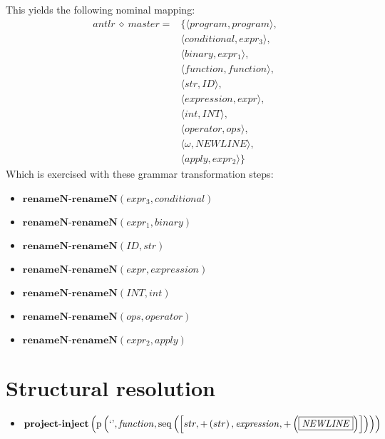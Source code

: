 This yields the following nominal mapping:
\begin{align*}\mathit{antlr} \:\diamond\: \mathit{master} =& \{\langle \mathit{program},\mathit{program}\rangle,\\
 & \langle \mathit{conditional},\mathit{expr_3}\rangle,\\
 & \langle \mathit{binary},\mathit{expr_1}\rangle,\\
 & \langle \mathit{function},\mathit{function}\rangle,\\
 & \langle str,\mathit{ID}\rangle,\\
 & \langle \mathit{expression},\mathit{expr}\rangle,\\
 & \langle int,\mathit{INT}\rangle,\\
 & \langle \mathit{operator},\mathit{ops}\rangle,\\
 & \langle \omega,\mathit{NEWLINE}\rangle,\\
 & \langle \mathit{apply},\mathit{expr_2}\rangle\}\end{align*}
 Which is exercised with these grammar transformation steps:

{\footnotesize\begin{itemize}
\item $\mathbf{renameN\text{-}renameN}\left(\mathit{expr_3},\mathit{conditional}\right)$
\item $\mathbf{renameN\text{-}renameN}\left(\mathit{expr_1},\mathit{binary}\right)$
\item $\mathbf{renameN\text{-}renameN}\left(\mathit{ID},str\right)$
\item $\mathbf{renameN\text{-}renameN}\left(\mathit{expr},\mathit{expression}\right)$
\item $\mathbf{renameN\text{-}renameN}\left(\mathit{INT},int\right)$
\item $\mathbf{renameN\text{-}renameN}\left(\mathit{ops},\mathit{operator}\right)$
\item $\mathbf{renameN\text{-}renameN}\left(\mathit{expr_2},\mathit{apply}\right)$
\end{itemize}}

\section{Structural resolution}
{\footnotesize\begin{itemize}
\item $\mathbf{project\text{-}inject}\\\left(\mathrm{p}\left(\text{`'},\mathit{function},\mathrm{seq}\left(\left[str, {+}\left(str\right), \mathit{expression}, {+}\left(\fbox{$\mathit{NEWLINE}$}\right)\right]\right)\right)\right)$
\end{itemize}}
